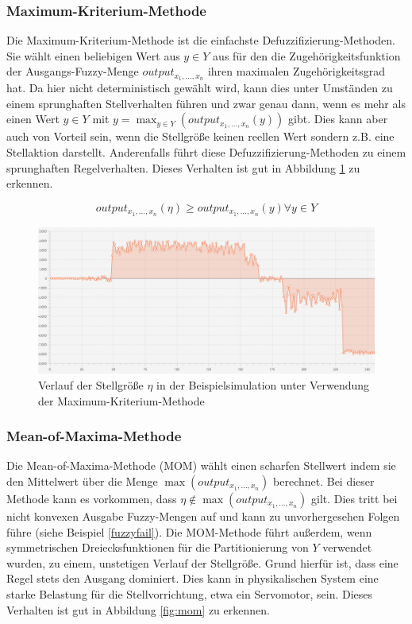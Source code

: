 \documentclass[12pt,a4paper,bibliography=totocnumbered,listof=totocnumbered]{scrartcl}
\theoremstyle{Umgebung}
\begin{document}
\subsubsection{Maximum-Kriterium-Methode}

Die Maximum-Kriterium-Methode ist die einfachste Defuzzifizierung-Methoden. Sie wählt einen beliebigen Wert aus $y \in Y$ aus für den die Zugehörigkeitsfunktion der Ausgangs-Fuzzy-Menge $output_{x_1,..., x_n}$ ihren maximalen Zugehörigkeitsgrad hat. Da hier nicht deterministisch gewählt wird, kann dies unter Umständen zu einem sprunghaften Stellverhalten führen und zwar genau dann, wenn es mehr als einen Wert $y \in Y$ mit $y = \max_{y \in Y}(output_{x_1,..., x_n}(y))$ gibt. Dies kann aber auch von Vorteil sein, wenn die Stellgröße keinen reellen Wert sondern z.B. eine Stellaktion darstellt. Anderenfalls führt diese Defuzzifizierung-Methoden zu einem sprunghaften Regelverhalten. Dieses Verhalten ist gut in Abbildung \ref{fig:max} zu erkennen. 

\begin{equation}
	output_{x_1,..., x_n}(\eta) \geq output_{x_1,..., x_n}(y) \forall y \in Y
\end{equation}

\begin{figure}
	\centering
	\includegraphics[width=0.8\linewidth]{img/defuzzy/max3}
	\caption{Verlauf der Stellgröße $\eta$ in der Beispielsimulation unter Verwendung der Maximum-Kriterium-Methode}
	\label{fig:max}
\end{figure}

\subsubsection{Mean-of-Maxima-Methode}

Die Mean-of-Maxima-Methode (MOM) wählt einen scharfen Stellwert indem sie den Mittelwert über die Menge $\max(output_{x_1,..., x_n})$ berechnet. Bei dieser Methode kann es vorkommen, dass $\eta \notin  \max(output_{x_1,..., x_n})$ gilt. Dies tritt bei nicht konvexen Ausgabe Fuzzy-Mengen auf und kann zu unvorhergesehen Folgen führe (siehe Beispiel \ref{fuzzyfail}). Die MOM-Methode führt außerdem, wenn symmetrischen Dreiecksfunktionen für die Partitionierung von $Y$ verwendet wurden, zu einem, unstetigen Verlauf der Stellgröße. Grund hierfür ist, dass eine Regel stets den Ausgang dominiert. Dies kann in physikalischen System eine starke Belastung für die Stellvorrichtung, etwa ein Servomotor, sein. Dieses Verhalten ist gut in Abbildung \ref{fig:mom} zu erkennen. 
 
\end{document}

